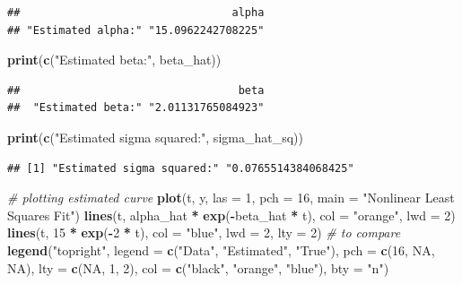 \documentclass[
]{article}
\newenvironment{Shaded}{\begin{snugshade}}{\end{snugshade}}
\newcommand{\AttributeTok}[1]{\textcolor[rgb]{0.13,0.29,0.53}{#1}}
\newcommand{\CommentTok}[1]{\textcolor[rgb]{0.56,0.35,0.01}{\textit{#1}}}
\newcommand{\ConstantTok}[1]{\textcolor[rgb]{0.56,0.35,0.01}{#1}}
\newcommand{\DecValTok}[1]{\textcolor[rgb]{0.00,0.00,0.81}{#1}}
\newcommand{\FunctionTok}[1]{\textcolor[rgb]{0.13,0.29,0.53}{\textbf{#1}}}
\newcommand{\NormalTok}[1]{#1}
\newcommand{\SpecialCharTok}[1]{\textcolor[rgb]{0.81,0.36,0.00}{\textbf{#1}}}
\newcommand{\StringTok}[1]{\textcolor[rgb]{0.31,0.60,0.02}{#1}}
\begin{document}
\begin{verbatim}
##                                 alpha 
## "Estimated alpha:" "15.0962242708225"
\end{verbatim}

\begin{Shaded}
\begin{Highlighting}[]
\FunctionTok{print}\NormalTok{(}\FunctionTok{c}\NormalTok{(}\StringTok{"Estimated beta:"}\NormalTok{, beta\_hat))}
\end{Highlighting}
\end{Shaded}

\begin{verbatim}
##                                  beta 
##  "Estimated beta:" "2.01131765084923"
\end{verbatim}

\begin{Shaded}
\begin{Highlighting}[]
\FunctionTok{print}\NormalTok{(}\FunctionTok{c}\NormalTok{(}\StringTok{"Estimated sigma squared:"}\NormalTok{, sigma\_hat\_sq))}
\end{Highlighting}
\end{Shaded}

\begin{verbatim}
## [1] "Estimated sigma squared:" "0.0765514384068425"
\end{verbatim}

\begin{Shaded}
\begin{Highlighting}[]
\CommentTok{\# plotting estimated curve}
\FunctionTok{plot}\NormalTok{(t, y, }\AttributeTok{las =} \DecValTok{1}\NormalTok{, }\AttributeTok{pch =} \DecValTok{16}\NormalTok{, }\AttributeTok{main =} \StringTok{"Nonlinear Least Squares Fit"}\NormalTok{)}
\FunctionTok{lines}\NormalTok{(t, alpha\_hat }\SpecialCharTok{*} \FunctionTok{exp}\NormalTok{(}\SpecialCharTok{{-}}\NormalTok{beta\_hat }\SpecialCharTok{*}\NormalTok{ t), }\AttributeTok{col =} \StringTok{"orange"}\NormalTok{, }\AttributeTok{lwd =} \DecValTok{2}\NormalTok{)}
\FunctionTok{lines}\NormalTok{(t, }\DecValTok{15} \SpecialCharTok{*} \FunctionTok{exp}\NormalTok{(}\SpecialCharTok{{-}}\DecValTok{2} \SpecialCharTok{*}\NormalTok{ t), }\AttributeTok{col =} \StringTok{"blue"}\NormalTok{, }\AttributeTok{lwd =} \DecValTok{2}\NormalTok{, }\AttributeTok{lty =} \DecValTok{2}\NormalTok{) }\CommentTok{\# to compare}
\FunctionTok{legend}\NormalTok{(}\StringTok{"topright"}\NormalTok{, }\AttributeTok{legend =} \FunctionTok{c}\NormalTok{(}\StringTok{"Data"}\NormalTok{, }\StringTok{"Estimated"}\NormalTok{, }\StringTok{"True"}\NormalTok{), }
       \AttributeTok{pch =} \FunctionTok{c}\NormalTok{(}\DecValTok{16}\NormalTok{, }\ConstantTok{NA}\NormalTok{, }\ConstantTok{NA}\NormalTok{), }\AttributeTok{lty =} \FunctionTok{c}\NormalTok{(}\ConstantTok{NA}\NormalTok{, }\DecValTok{1}\NormalTok{, }\DecValTok{2}\NormalTok{), }
       \AttributeTok{col =} \FunctionTok{c}\NormalTok{(}\StringTok{"black"}\NormalTok{, }\StringTok{"orange"}\NormalTok{, }\StringTok{"blue"}\NormalTok{), }\AttributeTok{bty =} \StringTok{"n"}\NormalTok{)}
\end{Highlighting}
\end{Shaded}
\end{document}

